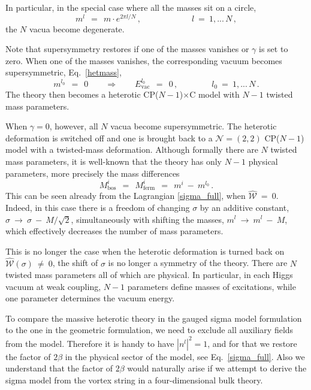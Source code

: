 \documentclass[12pt]{article}
\newcommand{\ntwot}{${\mathcal N}= \left(2,2\right) $ }
\newcommand{\mc}[1]{\mathcal{#1}}
\newcommand{\CPC}{CP($N-1$)$\times$C }
\begin{document}
	In particular, in the special case where all the masses sit on a circle, 
\[
	m^l ~~=~~ m \cdot e^{2\pi l/N}\,, \qquad\qquad\qquad  l ~=~ 1,...\, N\,,
\]
	the $ N $ vacua become degenerate.

	Note that supersymmetry restores if one of the masses vanishes or $ \gamma $ is set to zero.
	When one of the masses vanishes, the corresponding vacuum becomes supersymmetric,
	Eq.~\eqref{hetmass},
\[
	m^{l_0} ~~=~~ 0  \qquad \Rightarrow \qquad E_\text{vac}^{l_0} ~~=~~ 0\,, \qquad\qquad l_0 ~=~ 1,...\,N\,.
\]
	The theory then becomes a heterotic \CPC model with $ N - 1 $ twisted mass parameters.

	When $ \gamma = 0 $, however, all $ N $ vacua become supersymmetric.
	The heterotic deformation is switched off and one is brought back to a \ntwot CP($N-1$) model
	with a twisted-mass deformation.
	Although formally there are $ N $ twisted mass parameters, it is well-known that the theory 
	has only $ N - 1 $ physical parameters, more precisely the mass differences
\[
	M_\text{bos}^i ~~=~~ M_\text{ferm}^i ~~=~~ m^i ~-~ m^{l_0}\,.
\]
	This can be seen already from the Lagrangian \eqref{sigma_full}, when $ \hat{\mc{W}} ~=~ 0 $. 
	Indeed, in this case there is a freedom of changing $ \sigma $ by an additive constant, 
	$ \sigma ~\to~ \sigma ~-~ M/\sqrt{2} $, simultaneously with shifting the masses, $ m^l ~\to~ m^l ~-~ M $, 
	which effectively decreases the number of mass parameters.

	This is no longer the case when the heterotic deformation is turned back on $ \hat{\mc{W}}(\sigma) ~\neq~ 0 $,
	the shift of $ \sigma $ is no longer a symmetry of the theory.
	There are $ N $ twisted mass parameters all of which are physical. 
	In particular, in each Higgs vacuum at weak coupling, $ N - 1 $ parameters define masses of excitations, while one parameter determines
	the vacuum energy.




        To compare the massive heterotic theory in the gauged sigma model formulation to
        the one in the geometric formulation, we need to exclude all auxiliary fields from the model.
        Therefore it is handy to have $ | n^l |^2 = 1 $, and for that we restore the factor of 
        $ 2\beta $ in the physical sector of the model, see Eq.~\eqref{sigma_full}.
        Also we understand that the factor of $ 2\beta $ would naturally arise if we 
        attempt to derive the sigma model from the vortex string in a four-dimensional bulk theory.
\end{document}
